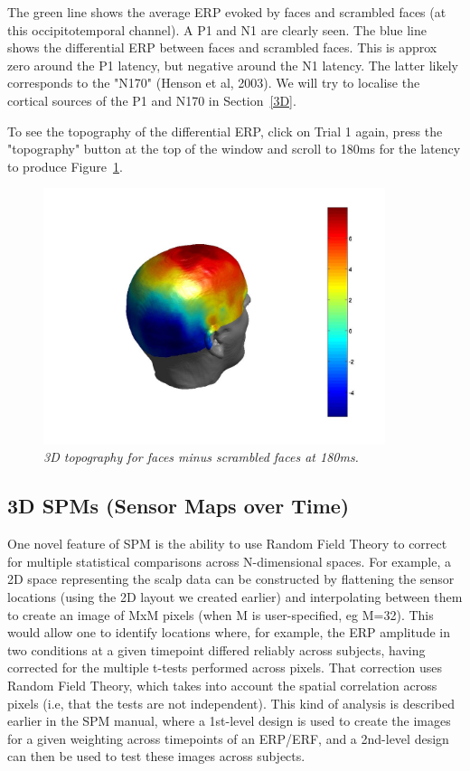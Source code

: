The green line shows the average ERP evoked by faces and scrambled faces (at this occipitotemporal channel). A P1 and N1 are clearly seen. The blue line shows the differential ERP between faces and scrambled faces. This is approx zero around the P1 latency, but negative around the N1 latency. The latter likely corresponds to the "N170" (Henson et al, 2003). We will try to localise the cortical sources of the P1 and N170 in Section~\ref{3D}.

To see the topography of the differential ERP, click on Trial 1 again, press the "topography" button at the top of the window and scroll to 180ms for the latency to produce Figure~\ref{fig_32_5}.

\begin{figure}
\begin{center}
\includegraphics[width=100mm]{multimodal/figures/figure_32_5}
\caption{\em 3D topography for faces minus scrambled faces at 180ms. \label{fig_32_5}}
\end{center}
\end{figure}


\subsection{3D SPMs (Sensor Maps over Time) \label{3DSPM}}

One novel feature of SPM is the ability to use Random Field Theory to correct for multiple statistical comparisons across N-dimensional spaces. For example, a 2D space representing the scalp data can be constructed by flattening the sensor locations (using the 2D layout we created earlier) and interpolating between them to create an image of MxM pixels (when M is user-specified, eg M=32). This would allow one to identify locations where, for example, the ERP amplitude in two conditions at a given timepoint differed reliably across subjects, having corrected for the multiple t-tests performed across pixels. That correction uses Random Field Theory, which takes into account the spatial correlation across pixels (i.e, that the tests are not independent). This kind of analysis is described earlier in the SPM manual, where a 1st-level design is used to create the images for a given weighting across timepoints of an ERP/ERF, and a 2nd-level design can then be used to test these images across subjects.

